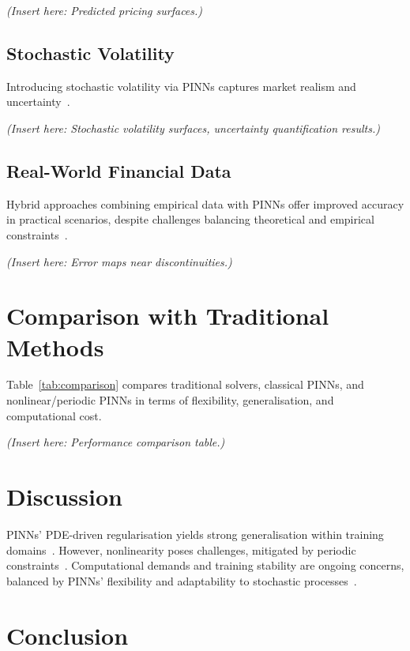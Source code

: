 \documentclass[12pt,a4paper]{article}
\begin{document}
\textit{(Insert here: Predicted pricing surfaces.)}

\subsection{Stochastic Volatility}

Introducing stochastic volatility via PINNs captures market realism and uncertainty~\cite{zang2020adaptive,yang2021bpn}.

\textit{(Insert here: Stochastic volatility surfaces, uncertainty quantification results.)}

\subsection{Real-World Financial Data}

Hybrid approaches combining empirical data with PINNs offer improved accuracy in practical scenarios, despite challenges balancing theoretical and empirical constraints~\cite{finlay2022train}.

\textit{(Insert here: Error maps near discontinuities.)}

\section{Comparison with Traditional Methods}

Table~\ref{tab:comparison} compares traditional solvers, classical PINNs, and nonlinear/periodic PINNs in terms of flexibility, generalisation, and computational cost.

\textit{(Insert here: Performance comparison table.)}

\section{Discussion}

PINNs' PDE-driven regularisation yields strong generalisation within training domains~\cite{cuomo2022scientific}. However, nonlinearity poses challenges, mitigated by periodic constraints~\cite{zhu2022periodic}. Computational demands and training stability are ongoing concerns, balanced by PINNs' flexibility and adaptability to stochastic processes~\cite{zang2020adaptive,mishra2022estimates}.

\section{Conclusion}
\end{document}
